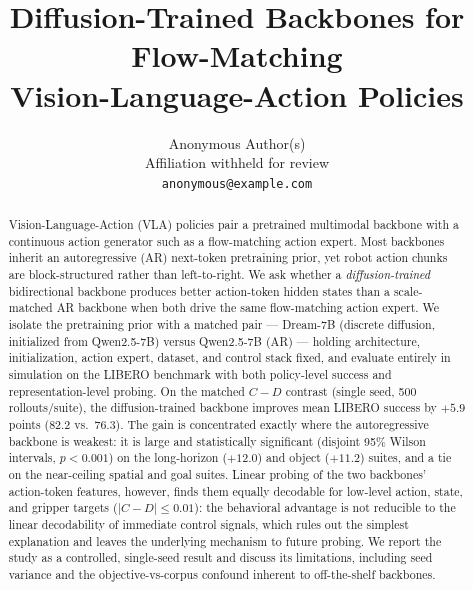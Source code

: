 \documentclass{article}
\title{Diffusion-Trained Backbones for Flow-Matching\\
Vision-Language-Action Policies}
\author{
  Anonymous Author(s)\\
  Affiliation withheld for review\\
  \texttt{anonymous@example.com}
}
\begin{document}
\maketitle

\begin{abstract}
Vision-Language-Action (VLA) policies pair a pretrained multimodal backbone with
a continuous action generator such as a flow-matching action expert. Most
backbones inherit an autoregressive (AR) next-token pretraining prior, yet robot
action chunks are block-structured rather than left-to-right. We ask whether a
\emph{diffusion-trained} bidirectional backbone produces better action-token
hidden states than a scale-matched AR backbone when both drive the same
flow-matching action expert. We isolate the pretraining prior with a matched pair
--- Dream-7B (discrete diffusion, initialized from Qwen2.5-7B) versus Qwen2.5-7B
(AR) --- holding architecture, initialization, action expert, dataset, and control
stack fixed, and evaluate entirely in simulation on the LIBERO benchmark with
both policy-level success and representation-level probing. On the matched $C-D$
contrast (single seed, 500 rollouts/suite), the diffusion-trained backbone improves
mean LIBERO success by $+5.9$ points (82.2 vs.\ 76.3). The gain is concentrated
exactly where the autoregressive backbone is weakest: it is large and statistically
significant (disjoint 95\% Wilson intervals, $p<0.001$) on the long-horizon
($+12.0$) and object ($+11.2$) suites, and a tie on the near-ceiling spatial and
goal suites. Linear probing of the two backbones' action-token features, however,
finds them equally decodable for low-level action, state, and gripper targets
($|C-D|\le0.01$): the behavioral advantage is not reducible to the linear
decodability of immediate control signals, which rules out the simplest
explanation and leaves the underlying mechanism to future probing. We report the study as a controlled, single-seed result and
discuss its limitations, including seed variance and the objective-vs-corpus
confound inherent to off-the-shelf backbones.
\end{abstract}

\end{document}

